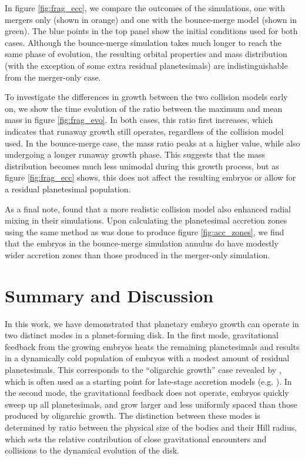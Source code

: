 \documentclass[twocolumn]{aastex63}
\begin{document}
In figure \ref{fig:frag_ecc}, we compare the outcomes of the simulations, one with mergers only (shown in orange) and one with 
the bounce-merge model (shown in green). The blue points in the top panel show the initial conditions used for both cases. 
Although the bounce-merge simulation takes much longer to reach the same phase of evolution, the resulting orbital properties 
and mass distribution (with the exception of some extra residual planetesimals) are indistinguishable from the merger-only case.

To investigate the differences in growth between the two collision models early on, we show the time evolution of the ratio 
between the maximum and mean mass in figure \ref{fig:frag_evo}. In both cases, this ratio first increases, which indicates that 
runaway growth still operates, regardless of the collision model used. In the bounce-merge case, the mass ratio peaks at a 
higher value, while also undergoing a longer runaway growth phase. This suggests that the mass distribution becomes much 
less unimodal during this growth process, but as figure \ref{fig:frag_ecc} shows, this does not affect the resulting embryos or 
allow for a residual planetesimal population.

As a final note, \citet{childs22} found that a more realistic collision model also enhanced radial mixing in their simulations. Upon 
calculating the planetesimal accretion zones using the same method as was done to produce figure \ref{fig:acc_zones}, we find 
that the embryos in the bounce-merge simulation annulus do have modestly wider accretion zones than those produced in the 
merger-only simulation.

\section{Summary and Discussion} \label{sec:discuss}

In this work, we have demonstrated that planetary embryo growth
can operate in two distinct modes in a planet-forming disk. In the first
mode, gravitational feedback from the growing embryos heats the
remaining planetesimals and results in a dynamically cold population
of embryos with a modest amount of residual planetesimals. This
corresponds to the ``oligarchic growth'' case revealed by \citep{kokubo98}, which is often used as a starting point for late-stage 
accretion models (e.g. \citet{kokubo02, raymond05, raymond06}). In the second mode, the gravitational feedback does not 
operate, embryos quickly sweep up all planetesimals, and grow larger and less uniformly spaced than those produced by 
oligarchic growth. The distinction between these modes is determined by ratio between the physical size of the bodies and their 
Hill radius, which sets the relative contribution of close gravitational encounters and collisions to the dynamical evolution of the 
disk.
\end{document}
